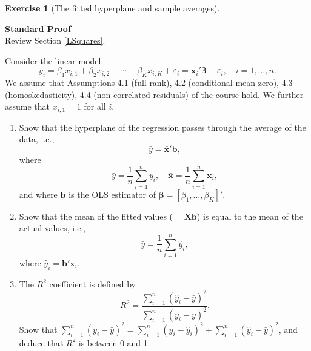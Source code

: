 \documentclass[
  11pt,
]{book}
\theoremstyle{definition}
\theoremstyle{definition}
\theoremstyle{definition}
\newtheorem{exercise}{Exercise}[chapter]
\theoremstyle{definition}
\theoremstyle{remark}
\begin{document}

\begin{exercisebox}

\begin{exercise}[The fitted hyperplane and sample averages]
\protect\hypertarget{exr:regressions-fitted-hyperplane}{}\label{exr:regressions-fitted-hyperplane}

\textbf{Standard \textbar{} Proof}\\
Review Section \ref{LSquares}.

Consider the linear model: \[y_i = \beta_1 x_{i,1} + \beta_2 x_{i,2} + \cdots + \beta_K x_{i,K} + \varepsilon_i = \mathbf{x}_i'\boldsymbol{\beta} + \varepsilon_i, \quad i = 1, \dots, n.\] We assume that Assumptions 4.1 (full rank), 4.2 (conditional mean zero), 4.3 (homoskedasticity), 4.4 (non-correlated residuals) of the course hold. We further assume that \(x_{i,1} = 1\) for all \(i\).

\begin{enumerate}
\def\labelenumi{\arabic{enumi}.}
\item
  Show that the hyperplane of the regression passes through the average of the data, i.e., \[\bar{y} = \bar{\mathbf{x}}'\mathbf{b},\] where \[\bar{y} = \frac{1}{n} \sum_{i=1}^n y_i, \quad \bar{\mathbf{x}} = \frac{1}{n} \sum_{i=1}^n \mathbf{x}_i,\] and where \(\mathbf{b}\) is the OLS estimator of \(\boldsymbol{\beta} = [\beta_1, \dots, \beta_K]'\).
\item
  Show that the mean of the fitted values (\(= \mathbf{X}\mathbf{b}\)) is equal to the mean of the actual values, i.e., \[\bar{y} = \frac{1}{n} \sum_{i=1}^n \hat{y}_i,\] where \(\hat{y}_i = \mathbf{b}'\mathbf{x}_i\).
\item
  The \(R^2\) coefficient is defined by \[R^2 = \frac{\sum_{i=1}^n (\hat{y}_i - \bar{y})^2}{\sum_{i=1}^n (y_i - \bar{y})^2}.\] Show that \(\sum_{i=1}^n (y_i - \bar{y})^2 = \sum_{i=1}^n (y_i - \hat{y}_i)^2 + \sum_{i=1}^n (\hat{y}_i - \bar{y})^2\), and deduce that \(R^2\) is between 0 and 1.
\end{enumerate}

\end{exercise}

\end{exercisebox}

\end{document}

